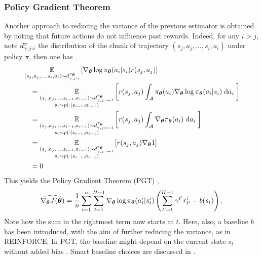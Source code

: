 \subsubsection{Policy Gradient Theorem} 
Another approach to reducing the variance of the previous estimator is obtained by noting that future actions do not influence past rewards. 
Indeed, for any $i>j$, note $\discountedstateoccupancydistribution[\gamma,j:i][\pi]$ the distribution of the chunk of trajectory $(s_j,a_j,\dots,s_i,a_{i})$ under policy $\pi$, then one has
\begin{align*}
    &\expectedvalue_{(s_j,a_j,\dots,s_i,a_{i})\sim\discountedstateoccupancydistribution[\gamma,j:i][\pi_{\vectorialform{\theta}}]}\left[\nabla_{\vectorialform{\theta}} \log \pi_{\vectorialform{\theta}}(a_i\vert s_i)r(s_{j},a_{j})\right] 
    \\&\quad= \expectedvalue_{\substack{(s_j,a_j,\dots,s_{i-1},a_{i-1})\sim\discountedstateoccupancydistribution[\gamma,j:i-1][\pi_{\vectorialform{\theta}}]\\s_i\sim p(\cdot\vert s_{i-1},a_{i-1})}}\left[ r(s_{j},a_{j})\int_{\actionspace}\pi_{\vectorialform{\theta}}(a_i) \nabla_{\vectorialform{\theta}} \log \pi_{\vectorialform{\theta}}(a_i\vert s_i)\;\de a_i\;\right]
    \\&\quad= \expectedvalue_{\substack{(s_j,a_j,\dots,s_{i-1},a_{i-1})\sim\discountedstateoccupancydistribution[\gamma,j:i-1][\pi_{\vectorialform{\theta}}]\\s_i\sim p(\cdot\vert s_{i-1},a_{i-1})}}\left[r(s_{j},a_{j})\int_{\actionspace}\nabla_{\vectorialform{\theta}}\pi_{\vectorialform{\theta}}(a_i) \;\de a_i\; \right]
    \\&\quad= \expectedvalue_{\substack{(s_j,a_j,\dots,s_{i-1},a_{i-1})\sim\discountedstateoccupancydistribution[\gamma,j:i-1][\pi_{\vectorialform{\theta}}]\\s_i\sim p(\cdot\vert s_{i-1},a_{i-1})}}\left[r(s_{j},a_{j})\nabla_{\vectorialform{\theta}}1\right]
    \\&\quad= 0
\end{align*}
This yields the Policy Gradient Theorem (PGT) \cite{sutton1999policy},
\begin{align}
\label{eq:pgt}
    \widehat{\nabla_{\vectorialform{\theta}} \expectedreturn[][](\vectorialform{\theta})} = \frac{1}{n}\sum_{i=1}^{n}\sum_{t=1}^{H-1} \nabla_{\vectorialform{\theta}} \log \pi_{\vectorialform{\theta}}(a_t^i\vert s_t^i)\left(\sum_{t'=t}^{H-1}\gamma^{t'} r_{t'}^i-b(s_t)\right).
\end{align}
Note how the sum in the rightmost term now starts at $t$. 
Here, also, a baseline $b$ has been introduced, with the aim of further reducing the variance, as in REINFORCE. 
In PGT, the baseline might depend on the current state $s_t$ without added bias \cite{peters2008reinforcement}.
Smart baseline choices are discussed in \cite{peters2008reinforcement}.


